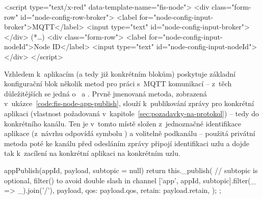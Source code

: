 \begin{code}[
    language=HTML,
    label=code:fis-node-template,
    caption={Ukázka z~implementace druhé povinné části deklarace bloku -- šablona formuláře v~jazyce HTML obsahuje
    jednotlivé vstupní pro pole pro korespondující parametry definovené v~registraci bloku do editoru
    v~ukázce~\ref{code:fis-node-constructor}.
    Atribut \ic{id="node-config-input-broker"} (a odpovídající) jsou důležité vzhledem k~chování editoru, nutná je shoda
    s~názvem parametru při registraci bloku -- stejně jako správné spárování šablony pomocí atributu
    \ic{data-template-name="fis-node"}.},
]
<script type="text/x-red" data-template-name="fis-node">
    <div class="form-row" id="node-config-row-broker">
        <label for="node-config-input-broker">MQTT</label>
        <input type="text" id="node-config-input-broker">
    </div>
    (*\ldots*)
    <div class="form-row">
        <label for="node-config-input-nodeId">Node ID</label>
        <input type="text" id="node-config-input-nodeId">
    </div>
</script>
\end{code}

Vzhledem k~aplikacím (a tedy již konkrétním blokům) poskytuje základní konfigurační blok několik metod pro práci
s~MQTT komunikací -- z~těch důležitějších se jedná o~ a .
Prvně jmenovaná metoda, zobrazená v~ukázce~\ref{code:fis-node-app-publish}, slouží k~publikování zprávy pro
konkrétní aplikaci (vlastnost požadovaná v~kapitole~\ref{sec:pozadavky-na-protokol}) -- tedy do konkrétního kanálu.
Ten je v~tomto místě složen z~jednoznačné identifikace aplikace  (z~návrhu odpovídá symbolu ) a
volitelně podkanálu -- použitá privátní metoda  poté ke kanálu před odesláním zprávy připojí identifikaci
uzlu a dojde tak k~zacílení na konkrétní aplikaci na konkrétním uzlu.

\begin{code}[
    language=Javascript,
    label=code:fis-node-app-publish,
    caption={Detail z~implementace třídy \ic{FisNode} -- metoda \ic{appPublish} poskytuje možnost konkrétnímu bloku
    odeslání zprávy do odpovídající aplikace na uzlu.}
]
appPublish(appId, payload, subtopic = null) {
    return this._publish(
        // subtopic is optional, filter() to avoid double slash in channel
        ['app', appId, subtopic].filter(_ => _).join('/'),
        {
            payload,
            qos: payload.qos,
            retain: payload.retain,
        }
    );
};
\end{code}

